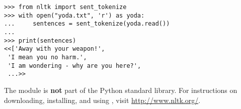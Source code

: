 \begin{lstlisting}
>>> from nltk import sent_tokenize
>>> with open("yoda.txt", 'r') as yoda:
...     sentences = sent_tokenize(yoda.read())
...
>>> print(sentences)
<<['Away with your weapon!',
 'I mean you no harm.',
 'I am wondering - why are you here?',
 ...>>
\end{lstlisting}

The  module is \textbf{not} part of the Python standard library.
For instructions on downloading, installing, and using , visit \url{http://www.nltk.org/}.

